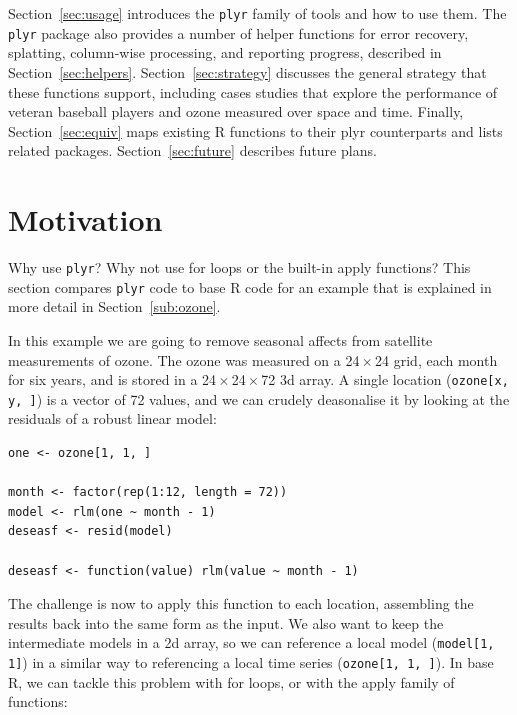 \documentclass{scrartcl}
\newcommand{\code}[1]{\lstinline!#1!}
\newcommand{\plyr}{{\tt plyr}\xspace}
\newcommand{\x}{\,$\times$\,}
\begin{document}
Section~\ref{sec:usage} introduces the {\tt plyr} family of tools and how to use them.  The {\tt plyr} package also provides a number of helper functions for error recovery, splatting, column-wise processing, and reporting progress,  described in Section~\ref{sec:helpers}. Section~\ref{sec:strategy} discusses the general strategy that these functions support, including cases studies that explore the performance of veteran baseball players and ozone measured over space and time.  Finally, Section~\ref{sec:equiv} maps existing R functions to their plyr counterparts and lists related packages.  Section~\ref{sec:future} describes future plans.

\section{Motivation}
\label{sec:motivation}

Why use \plyr?  Why not use for loops or the built-in apply functions?  This section compares \plyr code to base R code for an example that is explained in more detail in Section~\ref{sub:ozone}.  

In this example we are going to remove seasonal affects from satellite measurements of ozone.  The ozone was measured on a 24\x24 grid, each month for six years, and is stored in a 24\x24\x72 3d array. A single location (\code{ozone[x, y, ]}) is a vector of 72 values, and we can crudely deasonalise it by looking at the residuals of a robust linear model:

\begin{verbatim}
one <- ozone[1, 1, ]

month <- factor(rep(1:12, length = 72))
model <- rlm(one ~ month - 1)
deseasf <- resid(model)

deseasf <- function(value) rlm(value ~ month - 1)
\end{verbatim}

The challenge is now to apply this function to each location, assembling the results back into the same form as the input.  We also want to keep the intermediate models in a 2d array, so we can reference a local model (\code{model[1, 1]}) in a similar way to referencing a local time series (\code{ozone[1, 1, ]}).  In base R, we can tackle this problem with for loops, or with the apply family of functions:
\end{document}
